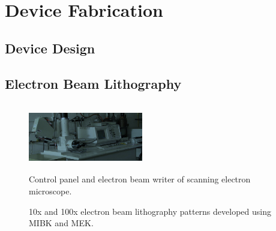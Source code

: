 \section{Device Fabrication}\label{sec:device_fabrication}
\subsection{Device Design}\label{subsec:device_design}
\subsection{Electron Beam Lithography}\label{subsec:lithography}
\begin{figure}[ht]
	\centering
	\includegraphics[height=3cm,width=5cm]{figs/experimental/SEM}
	\caption[Scanning electron microscope]{Control panel and electron beam writer of scanning electron microscope.}
	\label{fig:SEM_machine}
\end{figure}

\begin{figure}[ht]
	\centering
	\qquad
	\caption[Electron beam lithography patterns]{10x and 100x electron beam lithography patterns developed using \acs{MIBK} and \acs{MEK}.}
	\label{fig:ebeam_developed}
\end{figure}

